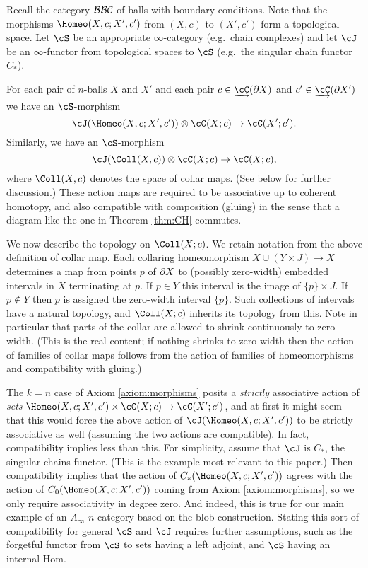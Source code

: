 Recall the category ${\mathcal{BBC}}$ of balls with boundary conditions.
Note that the morphisms $\Homeo(X,c; X', c')$ from $(X, c)$ to $(X', c')$ form a topological space.
Let $\cS$ be an appropriate $\infty$-category (e.g.\ chain complexes)
and let $\cJ$ be an $\infty$-functor from topological spaces to $\cS$
(e.g.\ the singular chain functor $C_*$).

\begin{axiom}
\label{axiom:families}
For each pair of $n$-balls $X$ and $X'$ and each pair $c\in \cl{\cC}(\bd X)$ and $c'\in \cl{\cC}(\bd X')$ we have an $\cS$-morphism
\[
	\cJ(\Homeo(X,c; X', c')) \ot \cC(X; c) \to \cC(X'; c') .
\]
Similarly, we have an $\cS$-morphism
\[
	\cJ(\Coll(X,c)) \ot \cC(X; c) \to \cC(X; c),
\]
where $\Coll(X,c)$ denotes the space of collar maps.
(See below for further discussion.)
These action maps are required to be associative up to coherent homotopy,
and also compatible with composition (gluing) in the sense that
a diagram like the one in Theorem \ref{thm:CH} commutes.
\end{axiom}

We now describe the topology on $\Coll(X; c)$.
We retain notation from the above definition of collar map.
Each collaring homeomorphism $X \cup (Y\times J) \to X$ determines a map from points $p$ of $\partial X$ to
(possibly zero-width) embedded intervals in $X$ terminating at $p$.
If $p \in Y$ this interval is the image of $\{p\}\times J$.
If $p \notin Y$ then $p$ is assigned the zero-width interval $\{p\}$.
Such collections of intervals have a natural topology, and $\Coll(X; c)$ inherits its topology from this.
Note in particular that parts of the collar are allowed to shrink continuously to zero width.
(This is the real content; if nothing shrinks to zero width then the action of families of collar
maps follows from the action of families of homeomorphisms and compatibility with gluing.)

The $k=n$ case of Axiom \ref{axiom:morphisms} posits a {\it strictly} associative action of {\it sets}
$\Homeo(X,c; X', c') \times \cC(X; c) \to \cC(X'; c')$, and at first it might seem that this would force the above
action of $\cJ(\Homeo(X,c; X', c'))$ to be strictly associative as well (assuming the two actions are compatible).
In fact, compatibility implies less than this.
For simplicity, assume that $\cJ$ is $C_*$, the singular chains functor.
(This is the example most relevant to this paper.)
Then compatibility implies that the action of $C_*(\Homeo(X,c; X', c'))$ agrees with the action
of $C_0(\Homeo(X,c; X', c'))$ coming from Axiom \ref{axiom:morphisms}, so we only require associativity in degree zero.
And indeed, this is true for our main example of an $A_\infty$ $n$-category based on the blob construction.
Stating this sort of compatibility for general $\cS$ and $\cJ$ requires further assumptions, 
such as the forgetful functor from $\cS$ to sets having a left adjoint, and $\cS$ having an internal Hom.

